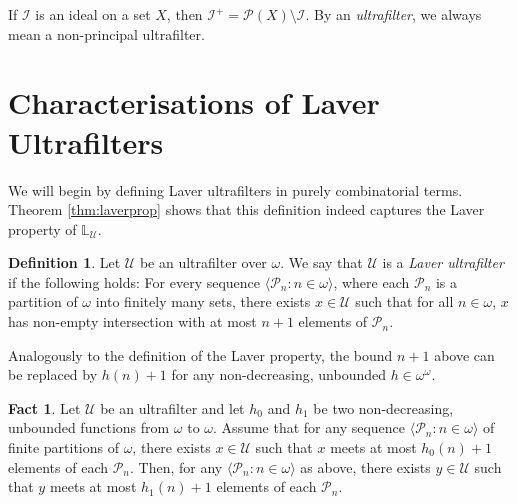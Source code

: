 \documentclass[12pt]{article}
\theoremstyle{definition}
\newtheorem{fct}[nummer]{\sc Fact}
\newtheorem{defi}[nummer]{\sc Definition}
\begin{document}

If $\mathcal{I}$ is an ideal on a set $X$, then $\mathcal{I}^{+}=\mathcal{P}(X)\setminus \mathcal{I}$. By an \emph{ultrafilter}, we always mean a non-principal ultrafilter. 

\section{Characterisations of Laver Ultrafilters}\label{section2}

We will begin by defining Laver ultrafilters in purely combinatorial terms. Theorem \ref{thm:laverprop} shows that this definition indeed captures the Laver property of $\mathbb{L}_{\mathcal{U}}$.

\begin{defi}\label{def:laver}
Let $\mathcal{U}$ be an ultrafilter over $\omega$. We say that $\mathcal{U}$ is a \textit{Laver ultrafilter} if the following holds: For every sequence $\langle \mathcal{P}_n: n \in \omega\rangle$, where each $\mathcal{P}_n$ is a partition of $\omega$ into finitely many sets, there exists $x \in \mathcal{U}$ such that for all $n \in \omega$, $x$ has non-empty intersection with at most $n+1$ elements of $\mathcal{P}_n$.
\end{defi}

Analogously to the definition of the Laver property, the bound $n+1$ above can be replaced by $h(n)+1$ for any non-decreasing, unbounded $h\in \omega^\omega$.

\begin{fct}\label{fct:bound}
	Let $\mathcal{U}$ be an ultrafilter and let $h_0$ and $h_1$ be two non-decreasing, unbounded functions from $\omega$ to $\omega$. Assume that for any sequence $\langle \mathcal{P}_n: n \in \omega\rangle$ of finite partitions of $\omega$, there exists $x \in \mathcal{U}$ such that $x$ meets at most $h_0(n)+1$ elements of each $\mathcal{P}_n$. Then, for any $\langle \mathcal{P}_n: n \in \omega\rangle$ as above, there exists $y \in \mathcal{U}$ such that $y$ meets at most $h_1(n)+1$ elements of each $\mathcal{P}_n$.
\end{fct}
\end{document}
